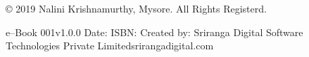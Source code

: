 \thispagestyle{empty}

© 2019 Nalini Krishnamurthy, Mysore. All Rights Registerd.

 e–Book
 001v1.0.0
 Date: 
 ISBN: 
 Created by: Sriranga Digital Software Technologies Private Limitedsrirangadigital.com

